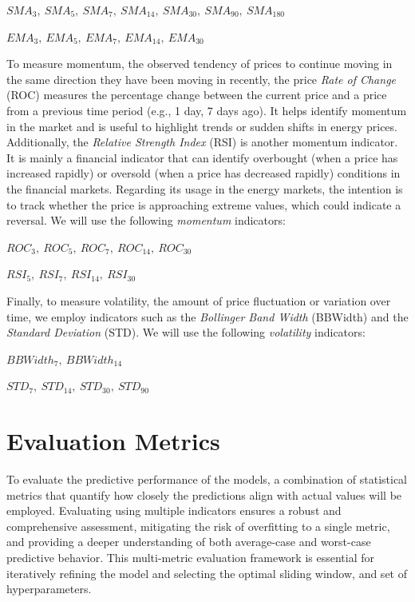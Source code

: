 \documentclass[12pt]{report} %
\begin{document}
    $ SMA_{3},\ SMA_{5},\ SMA_{7},\ SMA_{14},\ SMA_{30},\ SMA_{90},\ SMA_{180} $
    
    $ EMA_{3},\ EMA_{5},\ EMA_{7},\ EMA_{14},\ EMA_{30}  $

To measure momentum, the observed tendency of prices to continue moving in the same direction they have been moving in recently, the price \textit{Rate of Change} (ROC) measures the percentage change between the current price and a price from a previous time period (e.g., 1 day, 7 days ago). It helps identify momentum in the market and is useful to highlight trends or sudden shifts in energy prices. Additionally, the \textit{Relative Strength Index} (RSI) is another momentum indicator. It is mainly a financial indicator that can identify overbought (when a price has increased rapidly) or oversold (when a price has decreased rapidly) conditions in the financial markets. Regarding its usage in the energy markets, the intention is to track whether the price is approaching extreme values, which could indicate a reversal. We will use the following \textit{momentum} indicators:

    $ ROC_{3},\ ROC_{5},\ ROC_{7},\ ROC_{14},\ ROC_{30} $
    
    $ RSI_{5},\ RSI_{7},\ RSI_{14},\ RSI_{30} $

Finally, to measure volatility, the amount of price fluctuation or variation over time, we employ indicators such as the \textit{Bollinger Band Width} (BBWidth) and the \textit{Standard Deviation} (STD). We will use the following \textit{volatility} indicators:

    $ BBWidth_{7},\ BBWidth_{14} $
    
    $ STD_{7},\ STD_{14},\ STD_{30},\ STD_{90} $


\section{Evaluation Metrics}

To evaluate the predictive performance of the models, a combination of statistical metrics that quantify how closely the predictions align with actual values will be employed. Evaluating using multiple indicators ensures a robust and comprehensive assessment, mitigating the risk of overfitting to a single metric, and providing a deeper understanding of both average-case and worst-case predictive behavior. This multi-metric evaluation framework is essential for iteratively refining the model and selecting the optimal sliding window, and set of hyperparameters.
\end{document}
